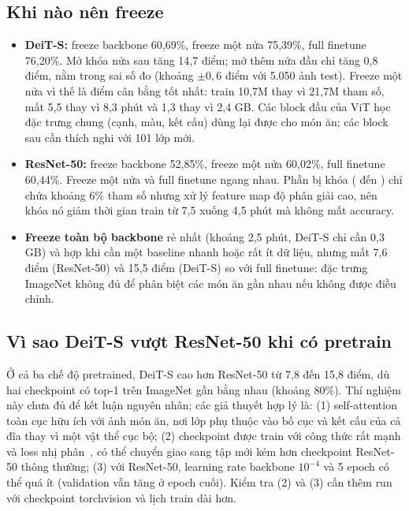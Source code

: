 \documentclass[11pt, a4paper]{article}
\begin{document}
\subsection{Khi nào nên freeze}
\begin{itemize}
  \item \textbf{DeiT-S:} freeze backbone 60,69\%, freeze một nửa 75,39\%, full finetune 76,20\%. Mở khóa nửa sau tăng 14,7 điểm; mở thêm nửa đầu chỉ tăng 0,8 điểm, nằm trong sai số đo (khoảng $\pm 0{,}6$ điểm với 5.050 ảnh test). Freeze một nửa vì thế là điểm cân bằng tốt nhất: train 10,7M thay vì 21,7M tham số, mất 5,5 thay vì 8,3 phút và 1,3 thay vì 2,4 GB. Các block đầu của ViT học đặc trưng chung (cạnh, màu, kết cấu) dùng lại được cho món ăn; các block sau cần thích nghi với 101 lớp mới.
  \item \textbf{ResNet-50:} freeze backbone 52,85\%, freeze một nửa 60,02\%, full finetune 60,44\%. Freeze một nửa và full finetune ngang nhau. Phần bị khóa ( đến ) chỉ chứa khoảng 6\% tham số nhưng xử lý feature map độ phân giải cao, nên khóa nó giảm thời gian train từ 7,5 xuống 4,5 phút mà không mất accuracy.
  \item \textbf{Freeze toàn bộ backbone} rẻ nhất (khoảng 2,5 phút, DeiT-S chỉ cần 0,3 GB) và hợp khi cần một baseline nhanh hoặc rất ít dữ liệu, nhưng mất 7,6 điểm (ResNet-50) và 15,5 điểm (DeiT-S) so với full finetune: đặc trưng ImageNet không đủ để phân biệt các món ăn gần nhau nếu không được điều chỉnh.
\end{itemize}

\subsection{Vì sao DeiT-S vượt ResNet-50 khi có pretrain}
Ở cả ba chế độ pretrained, DeiT-S cao hơn ResNet-50 từ 7,8 đến 15,8 điểm, dù hai checkpoint có top-1 trên ImageNet gần bằng nhau (khoảng 80\%). Thí nghiệm này chưa đủ để kết luận nguyên nhân; các giả thuyết hợp lý là: (1) self-attention toàn cục hữu ích với ảnh món ăn, nơi lớp phụ thuộc vào bố cục và kết cấu của cả đĩa thay vì một vật thể cục bộ; (2) checkpoint  được train với công thức rất mạnh và loss nhị phân~\cite{wightman2021rsb}, có thể chuyển giao sang tập mới kém hơn checkpoint ResNet-50 thông thường; (3) với ResNet-50, learning rate backbone $10^{-4}$ và 5 epoch có thể quá ít (validation vẫn tăng ở epoch cuối). Kiểm tra (2) và (3) cần thêm run với checkpoint torchvision và lịch train dài hơn.
\end{document}
